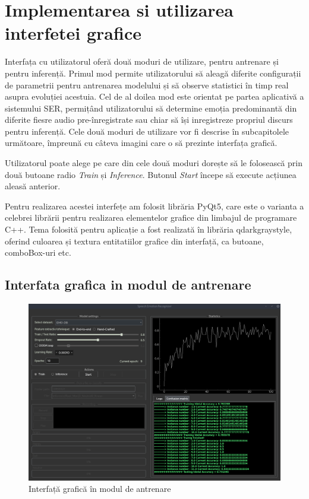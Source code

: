 \documentclass[a4paper,12pt]{book}
\begin{document}
	\section{Implementarea si utilizarea interfetei grafice}
		Interfața cu utilizatorul oferă două moduri de utilizare, pentru antrenare și pentru inferență. Primul mod permite utilizatorului să aleagă diferite configurații de parametrii pentru antrenarea modelului și să observe statistici în timp real asupra evoluției acestuia. Cel de al doilea mod este orientat pe partea aplicativă a sistemului SER, permițând utilizatorului să determine emoția predominantă din diferite fiesre audio pre-înregistrate sau chiar să își inregistreze propriul discurs pentru inferență. Cele două moduri de utilizare vor fi descrise în subcapitolele următoare, împreună cu câteva imagini care o să prezinte interfața grafică. \par 
		Utilizatorul poate alege pe care din cele două moduri dorește să le folosească prin două butoane radio \textit{Train} și \textit{Inference}. Butonul \textit{Start} începe să execute acțiunea aleasă anterior. \par
		
		Pentru realizarea acestei interfețe am folosit librăria PyQt5, care este o varianta a celebrei librării pentru realizarea elementelor grafice din limbajul de programare C++. Tema folosită pentru aplicație a fost realizată în librăria qdarkgraystyle, oferind culoarea și textura entitatiilor grafice din interfață, ca butoane, comboBox-uri etc. 
		
		\subsection{Interfata grafica in modul de antrenare} \label{guiAntrenare}
		
		\begin{figure}[h]					
			\hspace{0.75cm}
			\includegraphics[scale=0.33]{gui_training}
			\caption{Interfață grafică în modul de antrenare}
			\label{fig:gui_train_1}
		\end{figure} 
		
\end{document}
